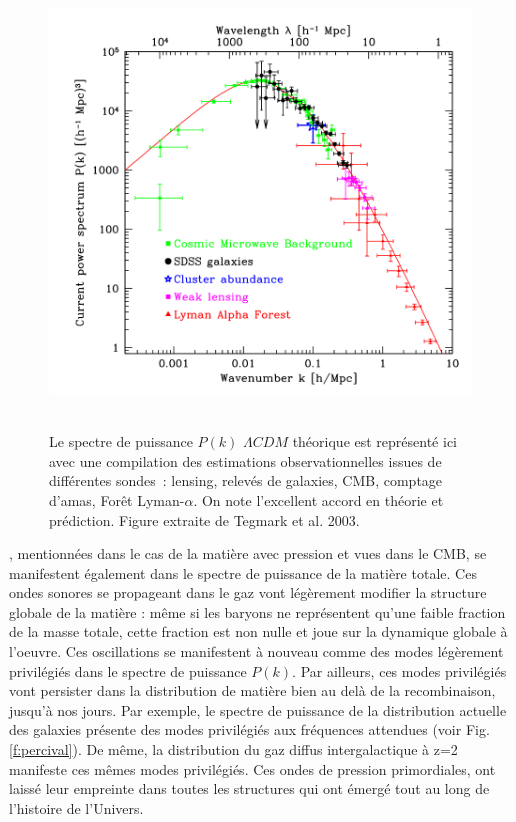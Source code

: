 \begin{figure}[htbp]
	\centering
		\includegraphics[height=12cm]{figs/pstegmark.png}
		\caption[Le spectre de puissance observé]{Le spectre de puissance $P(k)$ $\Lambda CDM$ théorique est représenté ici avec une compilation des estimations observationnelles issues de différentes sondes~: lensing, relevés de galaxies, CMB, comptage d'amas, Forêt Lyman-$\alpha$. On note l'excellent accord en théorie et prédiction.  Figure extraite de Tegmark et al. 2003. }
	\label{f:pktegmark}
\end{figure}


, mentionnées dans le cas de la matière avec pression et vues dans le CMB, se manifestent également dans le spectre de puissance de la matière totale. Ces ondes sonores se propageant dans le gaz vont légèrement modifier la structure globale de la matière : même si les baryons ne représentent qu'une faible fraction de la masse totale, cette fraction est non nulle et joue sur la dynamique globale à l'oeuvre. Ces oscillations se manifestent à nouveau comme des modes légèrement privilégiés dans le spectre de puissance $P(k)$. Par ailleurs, ces modes privilégiés vont persister dans la distribution de matière bien au delà de la recombinaison, jusqu'à nos jours. Par exemple, le spectre de puissance de la distribution actuelle des galaxies  présente des modes privilégiés aux fréquences attendues (voir Fig. \ref{f:percival}). De même, la distribution du gaz diffus intergalactique à z=2 manifeste ces mêmes modes privilégiés. Ces ondes de pression primordiales, ont laissé leur empreinte dans toutes les structures qui ont émergé tout au long de l'histoire de l'Univers.

